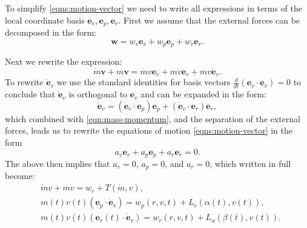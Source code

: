\documentclass{article}
\renewcommand{\vec}[1]{\boldsymbol{#1}}
\begin{document}
To simplify \eqref{eqns:motion-vector} we need to write all expressions in terms of the local coordinate basis $\vec e_v, \vec e_p, \vec e_r$. First we assume that the external forces can be decomposed in the form:
\[
\vec w = w_v \vec e_v + w_p \vec e_p + w_r \vec e_r.
\]

Next we rewrite the expression:
\begin{equation} \label{eqn:mass-momentum}
    \dot{m}\vec{v} + m \dot{\vec{v}} = \dot{m}v \vec{e}_v + m \dot v \vec{e}_v + m v \dot{\vec{e}}_v.
\end{equation}
To rewrite $\dot{\vec{e}}_v$ we use the standard identities for basis vectors $\frac{d}{dt}(\vec{e}_v \cdot \vec{e}_v)=0$
to conclude that $\dot{\vec{e}}_v$ is orthogonal to ${\vec{e}}_v$ and can be expanded in the form:
\[
\dot{\vec{e}}_v =  (\dot{\vec{e}}_v \cdot \vec{e}_p)\vec{e}_p + (\dot{\vec{e}}_v \cdot \vec{e}_r)\vec{e}_r,
\] 
which combined with \eqref{eqn:mass-momentum}, and the separation of the external forces, leads us to rewrite the equations of motion \eqref{eqns:motion-vector} in the form 
\[ 
a_v \vec e_v + a_p \vec e_p + a_r \vec e_r = 0.
\]
The above then implies that $a_v =0$, $a_p =0$, and $a_r =0$, which written in full become:
\begin{align} \label{eqn:thrust-momentum}
    &  \dot{m} v + m \dot v = w_r + T(\dot{m},v),
    \\
    \label{eqn:turn-momentum}
    &  m(t) v(t)({\vec{e}}_p \cdot \dot{\vec{e}}_v) = w_p(r,v,t) + L_c(\alpha(t),v(t)),
    \\
    \label{eqn:lift-momentum}
    & m(t) v(t)({\vec{e}_r}(t) \cdot \dot{\vec{e}}_v)=w_r(r,v,t)+L_u(\beta(t),v(t)).
\end{align}
\end{document}

